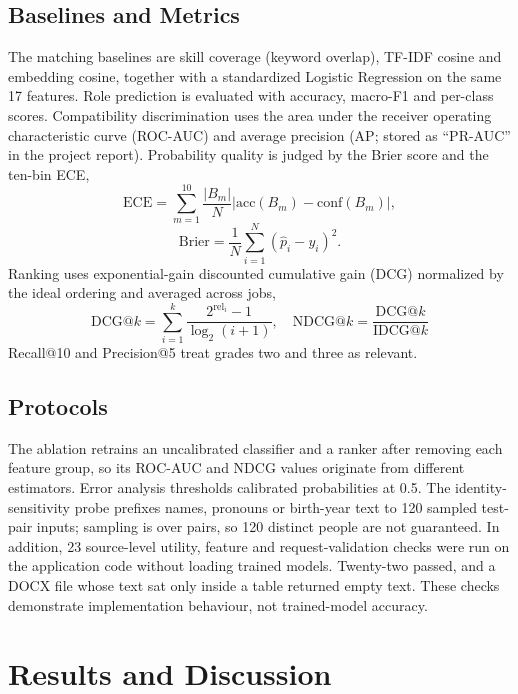 \documentclass[conference]{IEEEtran}
\begin{document}
\subsection{Baselines and Metrics}
The matching baselines are skill coverage (keyword overlap), TF-IDF cosine and embedding cosine, together with a standardized Logistic Regression on the same 17 features. Role prediction is evaluated with accuracy, macro-F1 and per-class scores. Compatibility discrimination uses the area under the receiver operating characteristic curve (ROC-AUC) and average precision (AP; stored as ``PR-AUC'' in the project report). Probability quality is judged by the Brier score and the ten-bin ECE,
\begin{equation}
\mathrm{ECE}=\sum_{m=1}^{10}\frac{|B_m|}{N}\left|\mathrm{acc}(B_m)-\mathrm{conf}(B_m)\right|,
\end{equation}
\begin{equation}
\mathrm{Brier}=\frac{1}{N}\sum_{i=1}^{N}(\hat{p}_i-y_i)^2.
\end{equation}
Ranking uses exponential-gain discounted cumulative gain (DCG) normalized by the ideal ordering and averaged across jobs,
\begin{equation}
\mathrm{DCG@}k=\sum_{i=1}^{k}\frac{2^{\mathrm{rel}_i}-1}{\log_2(i+1)},\quad
\mathrm{NDCG@}k=\frac{\mathrm{DCG@}k}{\mathrm{IDCG@}k}
\end{equation}
Recall@10 and Precision@5 treat grades two and three as relevant.

\subsection{Protocols}
The ablation retrains an uncalibrated classifier and a ranker after removing each feature group, so its ROC-AUC and NDCG values originate from different estimators. Error analysis thresholds calibrated probabilities at 0.5. The identity-sensitivity probe prefixes names, pronouns or birth-year text to 120 sampled test-pair inputs; sampling is over pairs, so 120 distinct people are not guaranteed. In addition, 23 source-level utility, feature and request-validation checks were run on the application code without loading trained models. Twenty-two passed, and a DOCX file whose text sat only inside a table returned empty text. These checks demonstrate implementation behaviour, not trained-model accuracy.

\section{Results and Discussion}
\end{document}

